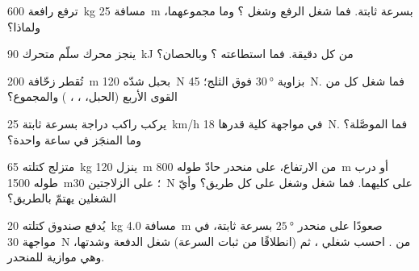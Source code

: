 \begin{exercise}[$\star$]\label{exo:g11:work-of-force:4}
ترفع رافعة \qty{600}{kg} مسافة \qty{25}{m} بسرعة ثابتة. فما شغل
 الرفع وشغل ؟ وما مجموعهما، ولماذا؟
\end{exercise}

\begin{exercise}[$\star$]\label{exo:g11:work-of-force:5}
ينجز محرك سلّم متحرك \qty{90}{kJ} من  كل دقيقة. فما استطاعته
؟ وبالحصان؟
\end{exercise}

\begin{exercise}[$\star\star$]\label{exo:g11:work-of-force:6}
تُقطر زحّافة \qty{200}{m} بحبل شدّه \qty{120}{N} بزاوية
$\qty{30}{\degree}$ فوق الثلج؛  \qty{45}{N}. فما شغل
كل  من القوى الأربع (الحبل، ، ، ) والمجموع؟
\end{exercise}

\begin{exercise}[$\star\star$]\label{exo:g11:work-of-force:7}
يركب راكب دراجة بسرعة ثابتة \qty{25}{km/h} في مواجهة  كلية قدرها
\qty{18}{N}. فما  الموصَّلة؟ وما  المنجَز في ساعة واحدة؟
\end{exercise}

\begin{exercise}[$\star\star$]\label{exo:g11:work-of-force:8}
متزلج كتلته \qty{65}{kg} ينزل \qty{120}{m} من الارتفاع، على منحدر
حادّ طوله \qty{800}{m} أو درب  طوله \qty{1500}{m}؛  على الزلاجتين
\qty{30}{N} على كليهما. فما شغل  وشغل  على كل طريق؟
وأيّ الشغلين يهتمّ بالطريق؟
\end{exercise}

\begin{exercise}[$\star\star$]\label{exo:g11:work-of-force:9}
يُدفع صندوق كتلته \qty{20}{kg} مسافة \qty{4.0}{m} صعودًا على منحدر
$\qty{25}{\degree}$ بسرعة ثابتة، في مواجهة \qty{30}{N} من . احسب
شغلي  ، ثم (انطلاقًا من ثبات السرعة)
شغل الدفعة وشدتها، وهي موازية للمنحدر.
\end{exercise}

